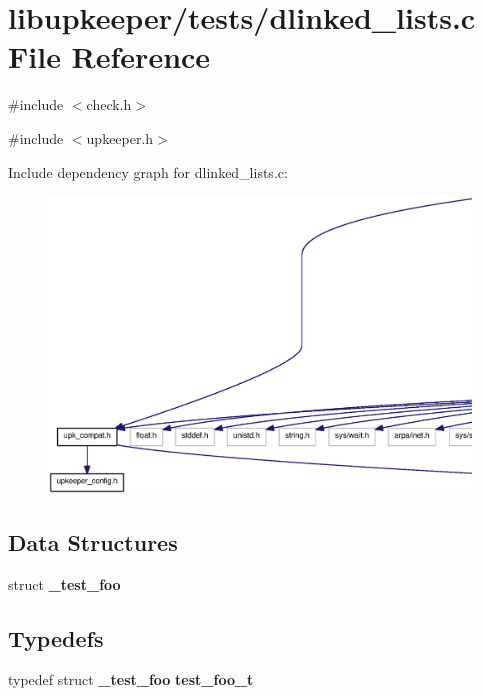 \section{libupkeeper/tests/dlinked\_\-lists.c File Reference}
\label{dlinked__lists_8c}
{\ttfamily \#include $<$check.h$>$}\par
{\ttfamily \#include $<$upkeeper.h$>$}\par
Include dependency graph for dlinked\_\-lists.c:\nopagebreak
\begin{figure}[H]
\begin{center}
\leavevmode
\includegraphics[width=400pt]{dlinked__lists_8c__incl}
\end{center}
\end{figure}
\subsection*{Data Structures}
\begin{DoxyCompactItemize}
\item 
struct {\bf \_\-test\_\-foo}
\end{DoxyCompactItemize}
\subsection*{Typedefs}
\begin{DoxyCompactItemize}
\item 
typedef struct {\bf \_\-test\_\-foo} {\bf test\_\-foo\_\-t}
\end{DoxyCompactItemize}
